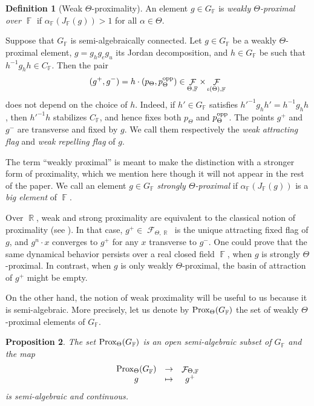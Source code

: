 \documentclass{amsart}
\theoremstyle{plain}
\newtheorem{proposition}{Proposition}[section]
\theoremstyle{definition}
\newtheorem{definition}[proposition]{Definition}
\DeclareMathOperator{\Fc}{\mathcal{F}}
\DeclareMathOperator{\Fb}{{\mathbb{F}}}
\DeclareMathOperator{\Rb}{{\mathbb{R}}}
\newcommand{\opp}{\textnormal{opp}}
\newcommand{\Prox}{\textnormal{Prox}}
\newcommand{\1}{\mathbf{1}}
\begin{document}
\begin{definition}[Weak $\Theta$-proximality] An element $g \in G_{\Fb}$ is \emph{weakly $\Theta$-proximal over $\Fb$} if
$\alpha_{\Fb}(J_{\Fb}(g)) > 1$ for all $\alpha \in \Theta$.
\end{definition}

Suppose that $G_{\Fb}$ is semi-algebraically connected. Let $g\in G_{\Fb}$ be a weakly $\Theta$-proximal element, $g= g_h g_e g_u$ its Jordan decomposition, and $h\in G_{\Fb}$ be such that $h^{-1} g_h h\in C_{\Fb}$. Then the pair
\[(g^+,g^-) = h\cdot (p_\Theta, p_\Theta^\opp)\in \Fc_{\Theta,\Fb} \times \Fc_{\iota(\Theta),\Fb}\]
does not depend on the choice of $h$. Indeed, if $h'\in G_{\Fb}$ satisfies $h'^{-1}g_hh'=h^{-1}g_hh$, then $h'^{-1}h$ stabilizes $C_{\Fb}$, and hence fixes both $p_\Theta$ and $p_\Theta^{\rm opp}$. 
The points $g^+$ and $g^-$ are transverse and fixed by $g$. We call them respectively the \emph{weak attracting flag} and \emph{weak repelling flag} of $g$.

The term ``weakly proximal'' is meant to make the distinction with a stronger form of proximality, which we mention here though it will not appear in the rest of the paper. We call an element $g\in G_{\Fb}$ \emph{strongly $\Theta$-proximal} if $\alpha_{\Fb}(J_{\Fb}(g))$ is a \emph{big element} of $\Fb$.

Over $\Rb$, weak and strong proximality are equivalent to the classical notion of proximality (see \cite{benoist1997proprietes}). In that case, $g^+ \in \Fc_{\Theta, \Rb}$ is the unique attracting fixed flag of $g$, and $g^n \cdot x$ converges to $g^+$ for any $x$ transverse to $g^-$. One could prove that the same dynamical behavior persists over a real closed field $\Fb$, when $g$ is strongly $\Theta$-proximal.
In contrast, when $g$ is only weakly $\Theta$-proximal, the basin of attraction of $g^+$ might be empty.


On the other hand, the notion of weak proximality will be useful to us because it is semi-algebraic. More precisely, let us denote by $\Prox_\Theta(G_{\Fb})$ the set of weakly $\Theta$-proximal elements of $G_{\Fb}$.

\begin{proposition} \label{prop: continuity g->g+ hyperbolic}
    The set $\Prox_\Theta(G_{\Fb})$ is an open semi-algebraic subset of $G_{\Fb}$ and the map
    \[\begin{array}{ccc}
        \Prox_\Theta(G_{\Fb}) & \to & \Fc_{\Theta,\Fb}\\
        g & \mapsto & g^+
    \end{array}\]
    is semi-algebraic and continuous.
\end{proposition}
\end{document}
